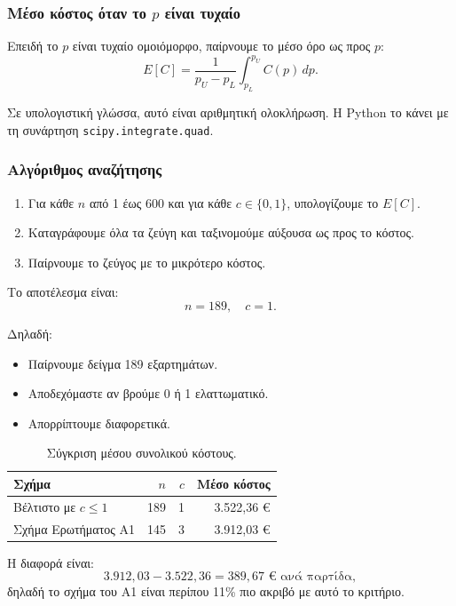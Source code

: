 \documentclass[12pt,a4paper]{article}
\newcommand{\code}[1]{\texttt{\textenglish{#1}}}
\begin{document}
\subsubsection*{Μέσο κόστος όταν το \(p\) είναι τυχαίο}

Επειδή το \(p\) είναι τυχαίο ομοιόμορφο, παίρνουμε το μέσο όρο ως προς \(p\):
\[
    E[C]=\frac{1}{p_U-p_L}\int_{p_L}^{p_U}C(p)\,dp.
\]

Σε υπολογιστική γλώσσα, αυτό είναι αριθμητική ολοκλήρωση. Η Python το κάνει
με τη συνάρτηση \code{scipy.integrate.quad}.

\subsubsection*{Αλγόριθμος αναζήτησης}

\begin{enumerate}[leftmargin=2.2em]
    \item Για κάθε \(n\) από 1 έως 600 και για κάθε \(c\in\{0,1\}\), υπολογίζουμε
    το \(E[C]\).
    \item Καταγράφουμε όλα τα ζεύγη και ταξινομούμε αύξουσα ως προς το κόστος.
    \item Παίρνουμε το ζεύγος με το μικρότερο κόστος.
\end{enumerate}

Το αποτέλεσμα είναι:
\[
    \boxed{n=189,\quad c=1}.
\]

Δηλαδή:

\begin{itemize}[leftmargin=2.2em]
    \item Παίρνουμε δείγμα 189 εξαρτημάτων.
    \item Αποδεχόμαστε αν βρούμε 0 ή 1 ελαττωματικό.
    \item Απορρίπτουμε διαφορετικά.
\end{itemize}

\begin{table}[H]
\centering
\caption{Σύγκριση μέσου συνολικού κόστους.}
\begin{tabular}{lrrr}
\toprule
\textbf{Σχήμα} & \textbf{\(n\)} & \textbf{\(c\)} & \textbf{Μέσο κόστος} \\
\midrule
Βέλτιστο με \(c\le 1\) & 189 & 1 & 3.522,36 € \\
Σχήμα Ερωτήματος Α1   & 145 & 3 & 3.912,03 € \\
\bottomrule
\end{tabular}
\end{table}

Η διαφορά είναι:
\[
    3.912{,}03-3.522{,}36=389{,}67 \text{ € ανά παρτίδα},
\]
δηλαδή το σχήμα του Α1 είναι περίπου 11\% πιο ακριβό με αυτό το κριτήριο.
\end{document}
